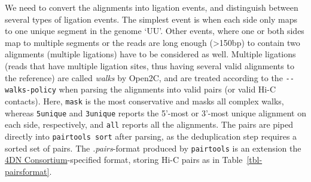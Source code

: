 \documentclass[
  11pt,
  a4paper,
]{scrbook}
\let\oldemph\emph
\renewcommand\emph[1]{\oldemph{\color{gray}#1}}
\begin{document}
We need to convert the alignments into ligation events, and distinguish
between several types of ligation events. The simplest event is when
each side only maps to one unique segment in the genome `UU'. Other
events, where one or both sides map to multiple segments or the reads
are long enough (\textgreater150bp) to contain two alignments (multiple
ligations) have to be considered as well. Multiple ligations (reads that
have multiple ligation sites, thus having several valid alignments to
the reference) are called \emph{walks} by Open2C, and are treated
according to the \texttt{-\/-walks-policy} when parsing the alignments
into valid pairs (or valid Hi-C contacts). Here, \texttt{mask} is the
most conservative and masks all complex walks, whereas \texttt{5unique}
and \texttt{3unique} reports the 5'-most or 3'-most unique alignment on
each side, respectively, and \texttt{all} reports all the alignments.
The pairs are piped directly into \texttt{pairtools\ sort} after
parsing, as the deduplication step requires a sorted set of pairs. The
\emph{.pairs}-format produced by \texttt{pairtools} is an extension the
\href{https://data.4dnucleome.org/file-formats/pairs/}{4DN
Consortium}-specified format, storing Hi-C pairs as in
Table~\ref{tbl-pairsformat}.

\small
\end{document}
